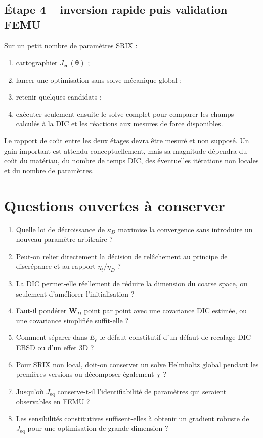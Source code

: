 \documentclass[11pt,a4paper]{article}
\begin{document}
\subsection{Étape 4 -- inversion rapide puis validation FEMU}

Sur un petit nombre de paramètres SRIX :
\begin{enumerate}
  \item cartographier $J_{\mathrm{eq}}(\bm{\theta})$ ;
  \item lancer une optimisation sans solve mécanique global ;
  \item retenir quelques candidats ;
  \item exécuter seulement ensuite le solve complet pour comparer les champs calculés à la DIC et les réactions aux mesures de force disponibles.
\end{enumerate}

Le rapport de coût entre les deux étages devra être mesuré et non supposé. Un gain important est
attendu conceptuellement, mais sa magnitude dépendra du coût du matériau, du nombre de temps DIC,
des éventuelles itérations non locales et du nombre de paramètres.

\section{Questions ouvertes à conserver}

\begin{methodbox}
\begin{enumerate}
  \item Quelle loi de décroissance de $\kappa_D$ maximise la convergence sans introduire un nouveau paramètre arbitraire ?
  \item Peut-on relier directement la décision de relâchement au principe de discrépance et au rapport $\eta_t/\eta_D$ ?
  \item La DIC permet-elle réellement de réduire la dimension du coarse space, ou seulement d'améliorer l'initialisation ?
  \item Faut-il pondérer $\bm{W}_D$ point par point avec une covariance DIC estimée, ou une covariance simplifiée suffit-elle ?
  \item Comment séparer dans $E_e$ le défaut constitutif d'un défaut de recalage DIC--EBSD ou d'un effet 3D ?
  \item Pour SRIX non local, doit-on conserver un solve Helmholtz global pendant les premières versions ou décomposer également $\chi$ ?
  \item Jusqu'où $J_{\mathrm{eq}}$ conserve-t-il l'identifiabilité de paramètres qui seraient observables en FEMU ?
  \item Les sensibilités constitutives suffisent-elles à obtenir un gradient robuste de $J_{\mathrm{eq}}$ pour une optimisation de grande dimension ?
\end{enumerate}
\end{methodbox}
\end{document}
